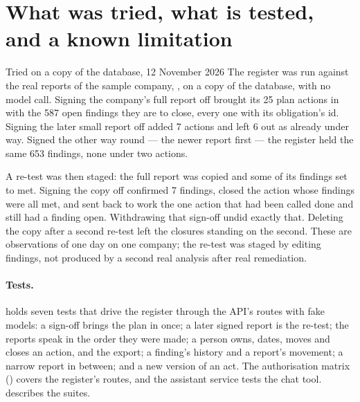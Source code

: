 \section{What was tried, what is tested, and a known limitation}\label{sec:register:tried}

\begin{lessonbox}{Tried on a copy of the database, 12 November 2026}
The register was run against the real reports of the sample company, \demo, on a copy of the
database, with no model call. Signing the company's full report off brought its 25 plan
actions in with the 587 open findings they are to close, every one with its obligation's id.
Signing the later small report off added 7 actions and left 6 out as already under way. Signed the other way round --- the newer report first --- the register held
the same 653 findings, none under two actions.

\smallskip
A re-test was then staged: the full report was copied and some of its findings set to met.
Signing the copy off confirmed 7 findings, closed the action whose findings were all met, and
sent back to work the one action that had been called done and still had a finding open.
Withdrawing that sign-off undid exactly that. Deleting the copy after a second re-test left
the closures standing on the second. These are observations of one day on one company; the
re-test was staged by editing findings, not produced by a second real analysis after real
remediation.
\end{lessonbox}

\paragraph{Tests.}  holds seven tests that drive the register
through the API's routes with fake models: a sign-off brings the plan in once; a later signed
report is the re-test; the reports speak in the order they were made; a person owns, dates,
moves and closes an action, and the export; a finding's history and a report's movement; a
narrow report in between; and a new version of an act. The authorisation matrix
() covers the register's routes, and the assistant service
tests the chat tool.  describes the suites.

